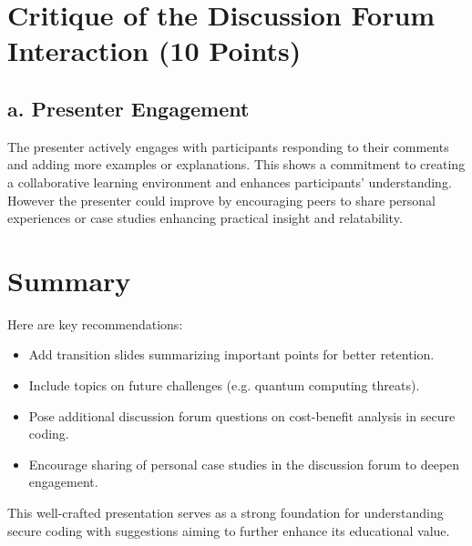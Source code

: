\documentclass{article}
\begin{document}
\section*{Critique of the Discussion Forum Interaction (10 Points)}

\subsection*{a. Presenter Engagement}

The presenter actively engages with participants responding to their comments and adding more examples or explanations. This shows a commitment to creating a collaborative learning environment and enhances participants' understanding. However the presenter could improve by encouraging peers to share personal experiences or case studies enhancing practical insight and relatability.

\section*{Summary}

Here are key recommendations:

\begin{itemize}
    \item Add transition slides summarizing important points for better retention.
    \item Include topics on future challenges (e.g. quantum computing threats).
    \item Pose additional discussion forum questions on cost-benefit analysis in secure coding.
    \item Encourage sharing of personal case studies in the discussion forum to deepen engagement.
\end{itemize}

This well-crafted presentation serves as a strong foundation for understanding secure coding with suggestions aiming to further enhance its educational value.
\end{document}
